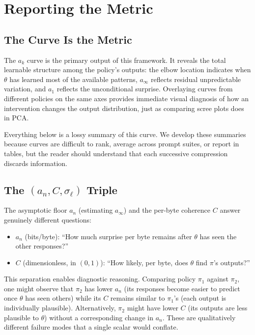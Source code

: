 \section{Reporting the Metric}

\subsection{The Curve Is the Metric}

The $a_k$ curve is the primary output of this framework.
It reveals the total learnable structure among the policy's outputs: the elbow location indicates when $\theta$ has learned most of the available patterns, $a_\infty$ reflects residual unpredictable variation, and $a_1$ reflects the unconditional surprise.
Overlaying curves from different policies on the same axes provides immediate visual diagnosis of how an intervention changes the output distribution, just as comparing scree plots does in PCA.

Everything below is a lossy summary of this curve.
We develop these summaries because curves are difficult to rank, average across prompt suites, or report in tables, but the reader should understand that each successive compression discards information.

\subsection{The \texorpdfstring{$(a_n, C, \sigma_\ell)$}{(a_n, C, sigma)} Triple}

The asymptotic floor $a_n$ (estimating $a_\infty$) and the per-byte coherence $C$ answer genuinely different questions:
\begin{itemize}[nosep]
    \item $a_n$ (bits/byte): ``How much surprise per byte remains after $\theta$ has seen the other responses?''
    \item $C$ (dimensionless, in $(0,1)$): ``How likely, per byte, does $\theta$ find $\pi$'s outputs?''
\end{itemize}

This separation enables diagnostic reasoning.
Comparing policy $\pi_1$ against $\pi_2$, one might observe that $\pi_2$ has lower $a_n$ (its responses become easier to predict once $\theta$ has seen others) while its $C$ remains similar to $\pi_1$'s (each output is individually plausible).
Alternatively, $\pi_2$ might have lower $C$ (its outputs are less plausible to $\theta$) without a corresponding change in $a_n$.
These are qualitatively different failure modes that a single scalar would conflate.

